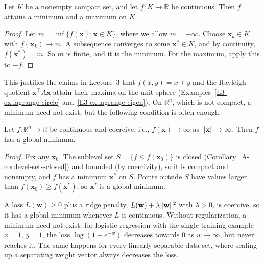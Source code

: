 \begin{theorem}\label{A-thm:extreme-value}
    Let $K$ be a nonempty compact set, and let $f: K \to \mathbb{R}$ be continuous. Then $f$ attains a minimum and a maximum on $K$.
\end{theorem}

\begin{proof}
    Let $m = \inf\{f(\mathbf{x}) : \mathbf{x} \in K\}$, where we allow $m = -\infty$. Choose $\mathbf{x}_k \in K$ with $f(\mathbf{x}_k) \to m$. A subsequence converges to some $\mathbf{x}^* \in K$, and by continuity, $f(\mathbf{x}^*) = m$. So $m$ is finite, and it is the minimum. For the maximum, apply this to $-f$.
\end{proof}

This justifies the claims in Lecture~3 that $f(x, y) = x + y$ and the Rayleigh quotient $\mathbf{x}^\top A\mathbf{x}$ attain their maxima on the unit sphere (Examples~\ref{L3-ex:lagrange-circle} and~\ref{L3-ex:lagrange-eigen}). On $\mathbb{R}^n$, which is not compact, a minimum need not exist, but the following condition is often enough.

\begin{proposition}\label{A-prop:coercive}
    Let $f: \mathbb{R}^n \to \mathbb{R}$ be continuous and coercive, i.e., $f(\mathbf{x}) \to \infty$ as $\lVert \mathbf{x} \rVert \to \infty$. Then $f$ has a global minimum.
\end{proposition}

\begin{proof}
    Fix any $\mathbf{x}_0$. The sublevel set $S = \{f \leq f(\mathbf{x}_0)\}$ is closed (Corollary~\ref{A-cor:level-sets-closed}) and bounded (by coercivity), so it is compact and nonempty, and $f$ has a minimum $\mathbf{x}^*$ on $S$. Points outside $S$ have values larger than $f(\mathbf{x}_0) \geq f(\mathbf{x}^*)$, so $\mathbf{x}^*$ is a global minimum.
\end{proof}

\begin{example}\label{A-ex:existence-ml}
    A loss $L(\mathbf{w}) \geq 0$ plus a ridge penalty, $L(\mathbf{w}) + \lambda\lVert \mathbf{w} \rVert^2$ with $\lambda > 0$, is coercive, so it has a global minimum whenever $L$ is continuous. Without regularization, a minimum need not exist: for logistic regression with the single training example $x = 1$, $y = 1$, the loss $\log(1 + e^{-w})$ decreases towards $0$ as $w \to \infty$, but never reaches it. The same happens for every linearly separable data set, where scaling up a separating weight vector always decreases the loss.
\end{example}

